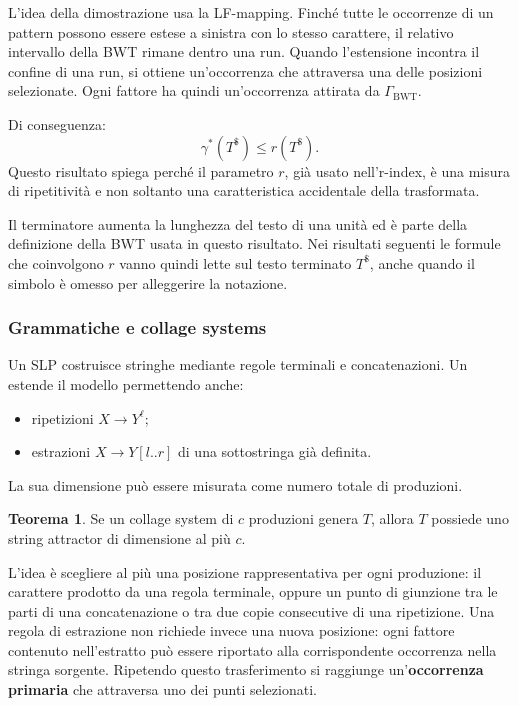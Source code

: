 \documentclass{article}
\theoremstyle{definition}
\newtheorem{theorem}{Teorema}[section] %
\numberwithin{equation}{section}
\begin{document}
L'idea della dimostrazione usa la LF-mapping. Finché tutte le occorrenze di un
pattern possono essere estese a sinistra con lo stesso carattere, il relativo
intervallo della BWT rimane dentro una run. Quando l'estensione incontra il
confine di una run, si ottiene un'occorrenza che attraversa una delle posizioni
selezionate. Ogni fattore ha quindi un'occorrenza attirata da
$\Gamma_{\mathrm{BWT}}$.

Di conseguenza:
\begin{equation}\label{eq:gamma_bwt_relation}
    \gamma^*(T^\$)\leq r(T^\$).
\end{equation}
Questo risultato spiega perché il parametro $r$, già usato nell'r-index, è una
misura di ripetitività e non soltanto una caratteristica accidentale della
trasformata.

Il terminatore aumenta la lunghezza del testo di una unità ed è parte della
definizione della BWT usata in questo risultato. Nei risultati seguenti le
formule che coinvolgono $r$ vanno quindi lette sul testo terminato $T^\$$,
anche quando il simbolo è omesso per alleggerire la notazione.

\subsubsection{Grammatiche e collage systems}
Un SLP costruisce stringhe mediante regole terminali e concatenazioni. Un
\textbf{} estende il modello permettendo anche:
\begin{itemize}
    \item ripetizioni $X\to Y^\ell$;
    \item estrazioni $X\to Y[l..r]$ di una sottostringa già definita.
\end{itemize}
La sua dimensione può essere misurata come numero totale di produzioni.

\begin{theorem}\label{theorem_grammar_induces_attractor}
    Se un collage system di $c$ produzioni genera $T$, allora $T$ possiede uno
    string attractor di dimensione al più $c$.
\end{theorem}

L'idea è scegliere al più una posizione rappresentativa per ogni produzione:
il carattere prodotto da una regola terminale, oppure un punto di giunzione tra
le parti di una concatenazione o tra due copie consecutive di una ripetizione.
Una regola di estrazione non richiede invece una nuova posizione: ogni fattore
contenuto nell'estratto può essere riportato alla corrispondente occorrenza
nella stringa sorgente. Ripetendo questo trasferimento si raggiunge
un'\textbf{occorrenza primaria} che attraversa uno dei punti selezionati.
\end{document}
